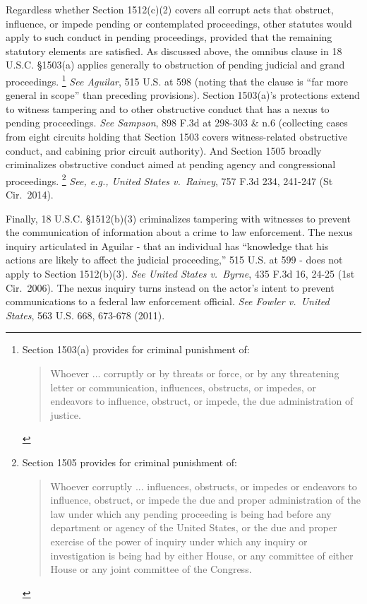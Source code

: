 Regardless whether Section 1512(c)(2) covers all corrupt acts that obstruct, influence, or impede pending or contemplated proceedings, other statutes would apply to such conduct in pending proceedings, provided that the remaining statutory elements are satisfied.
As discussed above, the omnibus clause in 18 U.S.C. \S 1503(a) applies generally to obstruction of pending judicial and grand proceedings.%
\footnote{Section 1503(a) provides for criminal punishment of:
\begin{quote}
Whoever ... corruptly or by threats or force, or by any threatening letter or communication, influences, obstructs, or impedes, or endeavors to influence, obstruct, or impede, the due administration of justice.
\end{quote}}
\textit{See Aguilar}, 515 U.S. at 598 (noting that the clause is “far more general in scope” than preceding provisions).
Section 1503(a)’s protections extend to witness tampering and to other obstructive conduct that has a nexus to pending proceedings.
\textit{See Sampson}, 898 F.3d at 298-303 \& n.6 (collecting cases from eight circuits holding that Section 1503 covers witness-related obstructive conduct, and cabining prior circuit authority).
And Section 1505 broadly criminalizes obstructive conduct aimed at pending agency and congressional proceedings.%
\footnote{Section 1505 provides for criminal punishment of:
\begin{quote}
Whoever corruptly ... influences, obstructs, or impedes or endeavors to influence, obstruct, or impede the due and proper administration of the law under which any pending proceeding is being had before any department or agency of the United States, or the due and proper exercise of the power of inquiry under which any inquiry or investigation is being had by either House, or any committee of either House or any joint committee of the Congress.
\end{quote}}
\textit{See, e.g., United States v.\ Rainey}, 757 F.3d 234, 241-247 (St Cir.~2014).

Finally, 18 U.S.C. \S 1512(b)(3) criminalizes tampering with witnesses to prevent the communication of information about a crime to law enforcement.
The nexus inquiry articulated in Aguilar - that an individual has “knowledge that his actions are likely to affect the judicial proceeding,” 515 U.S. at 599 - does not apply to Section 1512(b)(3).
\textit{See United States v.\ Byrne}, 435 F.3d 16, 24-25 (1st Cir.~2006).
The nexus inquiry turns instead on the actor’s intent to prevent communications to a federal law enforcement official.
\textit{See Fowler v.\ United States}, 563 U.S. 668, 673-678 (2011).

